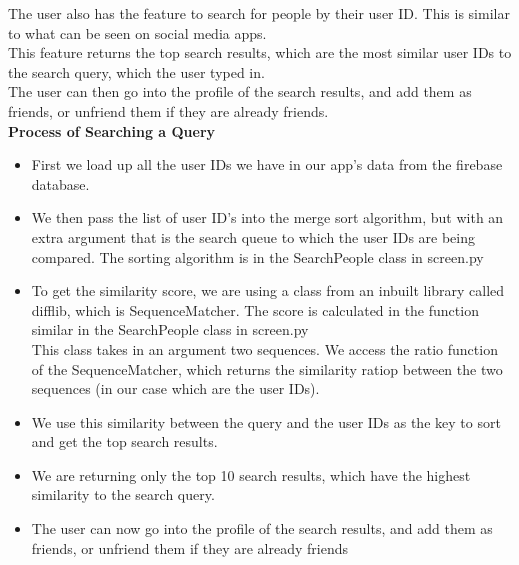 \documentclass[11pt]{report}
\begin{document}
The user also has the feature to search for people by their user ID. This is similar to what can be seen on social media apps. \\

This feature returns the top search results, which are the most similar user IDs to the search query, which the user typed in. \\

The user can then go into the profile of the search results, and add them as friends, or unfriend them if they are already friends.~\\

{\bf Process of Searching a Query}

\begin{itemize}
    \item First we load up all the user IDs we have in our app's data from the firebase database.\\
    
    \item We then pass the list of user ID's into the merge sort algorithm, but with an extra argument that is the search queue to which the user IDs are being compared. The sorting algorithm is in the SearchPeople class in screen.py\\
    
    \item To get the similarity score, we are using a class from an inbuilt library called difflib, which is SequenceMatcher. The score is calculated in the function similar in the SearchPeople class in screen.py\\
    
    This class takes in an argument two sequences. We access the ratio function of the SequenceMatcher, which returns the similarity ratiop between the two sequences (in our case which are the user IDs).\\
    
    \item We use this similarity between the query and the user IDs as the key to sort and get the top search results. \\
    
    \item We are returning only the top 10 search results, which have the highest similarity to the search query.
    
    \item The user can now go into the profile of the search results, and add them as friends, or unfriend them if they are already friends
\end{itemize}
\end{document}
